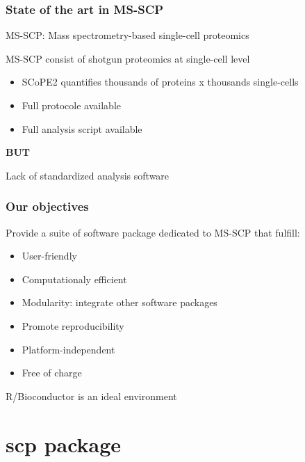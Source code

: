 \documentclass{beamer}
\newcommand{\frametitlesection}[1]{\frametitle{\centering #1 \footnotesize \hspace{0pt plus 1 filll} \insertsection}}
\begin{document}
\begin{frame}
    \frametitlesection{State of the art in MS-SCP}

    MS-SCP: Mass spectrometry-based single-cell proteomics 
    
    MS-SCP consist of shotgun proteomics at single-cell level 
    
    \begin{itemize}
        \item{SCoPE2 quantifies thousands of proteins x thousands single-cells}
        \item{Full protocole available}
        \item{Full analysis script available}
    \end{itemize}
    
    \textbf{BUT}
    
    Lack of standardized analysis software
\end{frame}

\begin{frame}
    \frametitlesection{Our objectives}

    Provide a suite of software package dedicated to MS-SCP that fulfill:

    \begin{itemize}
        \item{User-friendly}
        \item{Computationaly efficient}
        \item{Modularity: integrate other software packages}
        \item{Promote reproducibility}
        \item{Platform-independent}
        \item{Free of charge}
    \end{itemize}
    
    R/Bioconductor is an ideal environment
    
\end{frame}



\section{scp package}
\end{document}

